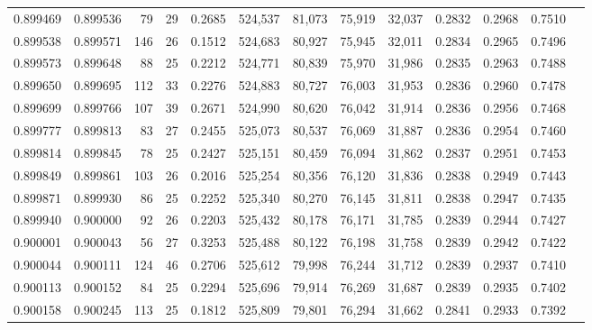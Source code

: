 \begin{tabular}{rrrrrrrrrrrrr}
0.899469 & 0.899536 &    79 &  29 &                                     0.2685 & 524,537 &  81,073 &  75,919 &  32,037 & 0.2832 & 0.2968 & 0.7510 \\
0.899538 & 0.899571 &   146 &  26 &                                     0.1512 & 524,683 &  80,927 &  75,945 &  32,011 & 0.2834 & 0.2965 & 0.7496 \\
0.899573 & 0.899648 &    88 &  25 &                                     0.2212 & 524,771 &  80,839 &  75,970 &  31,986 & 0.2835 & 0.2963 & 0.7488 \\
0.899650 & 0.899695 &   112 &  33 &                                     0.2276 & 524,883 &  80,727 &  76,003 &  31,953 & 0.2836 & 0.2960 & 0.7478 \\
0.899699 & 0.899766 &   107 &  39 &                                     0.2671 & 524,990 &  80,620 &  76,042 &  31,914 & 0.2836 & 0.2956 & 0.7468 \\
0.899777 & 0.899813 &    83 &  27 &                                     0.2455 & 525,073 &  80,537 &  76,069 &  31,887 & 0.2836 & 0.2954 & 0.7460 \\
0.899814 & 0.899845 &    78 &  25 &                                     0.2427 & 525,151 &  80,459 &  76,094 &  31,862 & 0.2837 & 0.2951 & 0.7453 \\
0.899849 & 0.899861 &   103 &  26 &                                     0.2016 & 525,254 &  80,356 &  76,120 &  31,836 & 0.2838 & 0.2949 & 0.7443 \\
0.899871 & 0.899930 &    86 &  25 &                                     0.2252 & 525,340 &  80,270 &  76,145 &  31,811 & 0.2838 & 0.2947 & 0.7435 \\
0.899940 & 0.900000 &    92 &  26 &                                     0.2203 & 525,432 &  80,178 &  76,171 &  31,785 & 0.2839 & 0.2944 & 0.7427 \\
0.900001 & 0.900043 &    56 &  27 &                                     0.3253 & 525,488 &  80,122 &  76,198 &  31,758 & 0.2839 & 0.2942 & 0.7422 \\
0.900044 & 0.900111 &   124 &  46 &                                     0.2706 & 525,612 &  79,998 &  76,244 &  31,712 & 0.2839 & 0.2937 & 0.7410 \\
0.900113 & 0.900152 &    84 &  25 &                                     0.2294 & 525,696 &  79,914 &  76,269 &  31,687 & 0.2839 & 0.2935 & 0.7402 \\
0.900158 & 0.900245 &   113 &  25 &                                     0.1812 & 525,809 &  79,801 &  76,294 &  31,662 & 0.2841 & 0.2933 & 0.7392 \\

\end{tabular}

